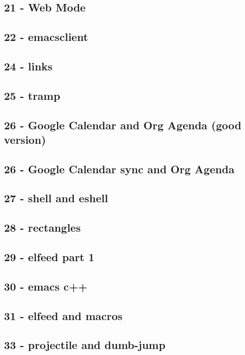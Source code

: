 \documentclass[11pt]{article}
\begin{document}
\subsection{21 - Web Mode}
\label{sec:org31b0aaf}
\subsection{22 - emacsclient}
\label{sec:orgd6b98ee}
\subsection{24 - links}
\label{sec:org4ec0f7b}
\subsection{25 - tramp}
\label{sec:org67e9ab4}
\subsection{26 - Google Calendar and Org Agenda (good version)}
\label{sec:org0515192}
\subsection{26 - Google Calendar sync and Org Agenda}
\label{sec:org4f8188e}
\subsection{27 - shell and eshell}
\label{sec:org4ea71c5}
\subsection{28 - rectangles}
\label{sec:orgf71709b}
\subsection{29 - elfeed part 1}
\label{sec:orge6632c0}
\subsection{30 - emacs c++}
\label{sec:org5039fd8}
\subsection{31 - elfeed and macros}
\label{sec:orgf63827c}
\subsection{33 - projectile and dumb-jump}
\label{sec:org213221e}
\end{document}
